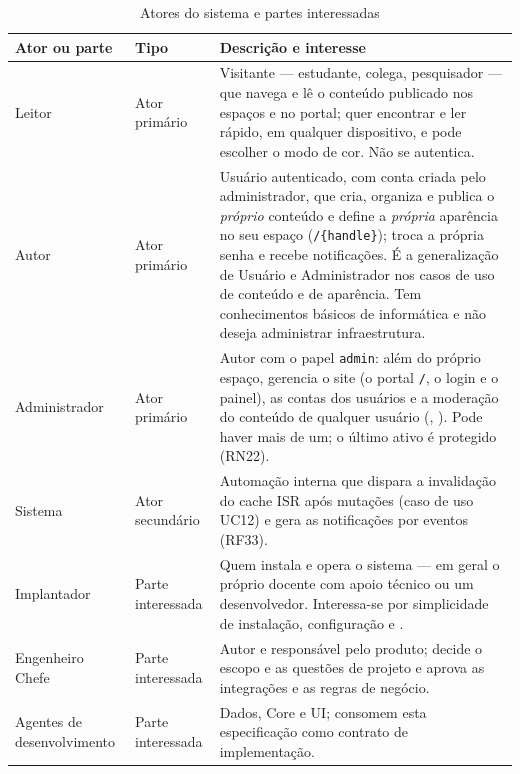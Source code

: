 \begin{table}[htb]
\caption{Atores do sistema e partes interessadas}\label{tab:atores}
\small
\begin{tabularx}{\linewidth}{@{}L{2.8cm}L{2.4cm}Y@{}}
\toprule
\textbf{Ator ou parte} & \textbf{Tipo} & \textbf{Descrição e interesse}\\
\midrule
Leitor & Ator primário & Visitante --- estudante, colega, pesquisador --- que navega e lê o conteúdo publicado nos espaços e no portal; quer encontrar e ler rápido, em qualquer dispositivo, e pode escolher o modo de cor. Não se autentica.\\
\addlinespace
Autor & Ator primário & Usuário autenticado, com conta criada pelo administrador, que cria, organiza e publica o \emph{próprio} conteúdo e define a \emph{própria} aparência no seu espaço (\texttt{/\{handle\}}); troca a própria senha e recebe notificações. É a generalização de Usuário e Administrador nos casos de uso de conteúdo e de aparência. Tem conhecimentos básicos de informática e não deseja administrar infraestrutura.\\
\addlinespace
Administrador & Ator primário & Autor com o papel \texttt{admin}: além do próprio espaço, gerencia o site (o portal \texttt{/}, o login e o painel), as contas dos usuários e a moderação do conteúdo de qualquer usuário (, ). Pode haver mais de um; o último ativo é protegido (RN22).\\
\addlinespace
Sistema & Ator secundário & Automação interna que dispara a invalidação do cache ISR após mutações (caso de uso UC12) e gera as notificações por eventos (RF33).\\
\addlinespace
Implantador & Parte interessada & Quem instala e opera o sistema --- em geral o próprio docente com apoio técnico ou um desenvolvedor. Interessa-se por simplicidade de instalação, configuração e .\\
\addlinespace
Engenheiro Chefe & Parte interessada & Autor e responsável pelo produto; decide o escopo e as questões de projeto e aprova as integrações e as regras de negócio.\\
\addlinespace
Agentes de desenvolvimento & Parte interessada & Dados, Core e UI; consomem esta especificação como contrato de implementação.\\
\bottomrule
\end{tabularx}
\end{table}

